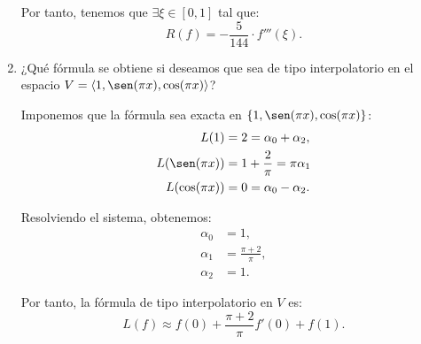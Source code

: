 \begin{ejercicio}
\begin{enumerate}
        Por tanto, tenemos que $\exists \xi\in [0, 1]$ tal que:
        \begin{equation*}
            R(f) = -\dfrac{5}{144}\cdot f'''(\xi).
        \end{equation*}
        \item ¿Qué fórmula se obtiene si deseamos que sea de tipo interpolatorio en el espacio $V = \langle 1, \sen(\pi x), \cos(\pi x)\rangle$?
        
        Imponemos que la fórmula sea exacta en $\{1, \sen(\pi x), \cos(\pi x)\}$:
        \begin{align*}
            L(1) &= 2 = \alpha_0 + \alpha_2,\\
            L(\sen(\pi x)) &= 1 + \frac{2}{\pi} = \pi\alpha_1\\
            L(\cos(\pi x)) &= 0 = \alpha_0 - \alpha_2.
        \end{align*}

        Resolviendo el sistema, obtenemos:
        \begin{align*}
            \alpha_0 &= 1,\\
            \alpha_1 &= \frac{\pi + 2}{\pi},\\
            \alpha_2 &= 1.
        \end{align*}

        Por tanto, la fórmula de tipo interpolatorio en $V$ es:
        \begin{equation*}
            L(f) \approx f(0) + \frac{\pi + 2}{\pi} f'\left(0\right) + f(1).
        \end{equation*}
    \end{enumerate}
\end{ejercicio}

